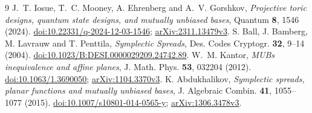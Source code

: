 \documentclass[11pt]{article}
\begin{document}
\begin{thebibliography}{9}
 J.~T. Iosue, T.~C. Mooney, A. Ehrenberg and A.~V. Gorshkov,
\emph{Projective toric designs, quantum state designs, and mutually unbiased bases},
Quantum \textbf{8}, 1546 (2024).
\href{https://doi.org/10.22331/q-2024-12-03-1546}{doi:10.22331/q-2024-12-03-1546};
\href{https://arxiv.org/abs/2311.13479v3}{arXiv:2311.13479v3}.
 S. Ball, J. Bamberg, M. Lavrauw and T. Penttila,
\emph{Symplectic Spreads},
Des. Codes Cryptogr. \textbf{32}, 9--14 (2004).
\href{https://doi.org/10.1023/B:DESI.0000029209.24742.89}{doi:10.1023/B:DESI.0000029209.24742.89}.
 W.~M. Kantor,
\emph{MUBs inequivalence and affine planes},
J. Math. Phys. \textbf{53}, 032204 (2012).
\href{https://doi.org/10.1063/1.3690050}{doi:10.1063/1.3690050};
\href{https://arxiv.org/abs/1104.3370v3}{arXiv:1104.3370v3}.
 K. Abdukhalikov,
\emph{Symplectic spreads, planar functions and mutually unbiased bases},
J. Algebraic Combin. \textbf{41}, 1055--1077 (2015).
\href{https://doi.org/10.1007/s10801-014-0565-y}{doi:10.1007/s10801-014-0565-y};
\href{https://arxiv.org/abs/1306.3478v3}{arXiv:1306.3478v3}.
\end{thebibliography}
\end{document}
